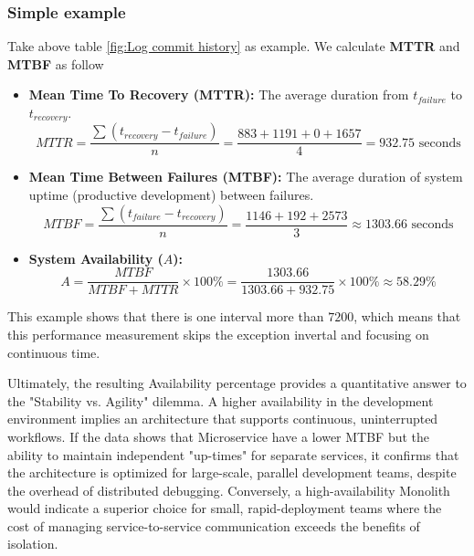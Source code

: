 \subsubsection{Simple example}

Take above table \ref{fig:Log commit history} as example. We calculate \textbf{MTTR} and \textbf{MTBF} as follow

\begin{itemize}
    \item \textbf{Mean Time To Recovery (MTTR):} The average duration from $t_{failure}$ to $t_{recovery}$.
    \begin{equation}
    MTTR = \frac{\sum (t_{recovery} - t_{failure})}{n} = \frac{883+1191 + 0 + 1657}{4} = 932.75 \text{ seconds}
    \end{equation}
    \item \textbf{Mean Time Between Failures (MTBF):} The average duration of system uptime (productive development) between failures.
    \begin{equation}
    MTBF = \frac{\sum (t_{failure} - t_{recovery})}{n} = \frac{1146 + 192 + 2573}{3} \approx 1303.66 \text{ seconds}
    \end{equation}
    \item \textbf{System Availability ($A$):}
    \begin{equation}
    A = \frac{MTBF}{MTBF + MTTR} \times 100\% = \frac{1303.66}{1303.66 +  932.75} \times 100\% \approx 58.29\%
    \end{equation}
\end{itemize}

This example shows that there is one interval more than  $7200$, which means that this
performance measurement skips the exception invertal and focusing on continuous time.

Ultimately, the resulting Availability percentage provides a quantitative answer to the "Stability vs. Agility" dilemma. A higher availability in the development environment implies an architecture that supports continuous, uninterrupted workflows. If the data shows that Microservice have a lower MTBF but the ability to maintain independent "up-times" for separate services, it confirms that the architecture is optimized for large-scale, parallel development teams, despite the overhead of distributed debugging. Conversely, a high-availability Monolith would indicate a superior choice for small, rapid-deployment teams where the cost of managing service-to-service communication exceeds the benefits of isolation.

